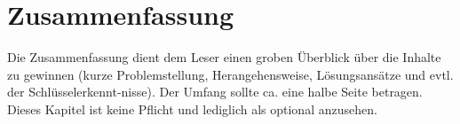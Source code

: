 \section*{Zusammenfassung}   %
Die Zusammenfassung dient dem Leser einen groben Überblick über die Inhalte zu gewinnen (kurze Problemstellung, Herangehensweise, Lösungsansätze und evtl. der Schlüsselerkennt-nisse). Der Umfang sollte ca. eine halbe Seite betragen. Dieses Kapitel ist keine Pflicht und lediglich als optional anzusehen.
